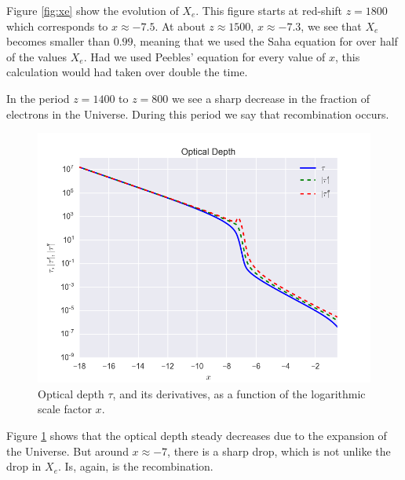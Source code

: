 \documentclass[a4paper,norsk, 10pt]{article}
\begin{document}
Figure \ref{fig:xe} show the evolution of $X_e$. This figure starts at red-shift $z=1800$ which corresponds to $x\approx -7.5$. At about $z\approx 1500$, $x\approx -7.3$, we see that $X_e$ becomes smaller than $0.99$, meaning that we used the Saha equation for over half of the values $X_e$. Had we used Peebles' equation for every value of $x$, this calculation would had taken over double the time.

In the period $z = 1400$ to $z = 800$ we see a sharp decrease in the fraction of electrons in the Universe. During this period we say that recombination occurs.

\begin{figure}[!htb]
\centering
\includegraphics[scale=0.5]{tau.png}
\caption{Optical depth $\tau$, and its derivatives, as a function of the logarithmic scale factor $x$.}\label{fig:tau}
\end{figure}

Figure \ref{fig:tau} shows that the optical depth steady decreases due to the expansion of the Universe. But around $x\approx -7$, there is a sharp drop, which is not unlike the drop in $X_e$. Is, again, is the recombination. 
\end{document}
